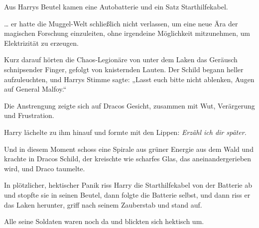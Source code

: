 Aus Harrys Beutel kamen eine Autobatterie und ein Satz Starthilfekabel.

… er hatte die Muggel-Welt schließlich nicht verlassen, um eine neue Ära der magischen Forschung einzuleiten, ohne irgendeine Möglichkeit mitzunehmen, um Elektrizität zu erzeugen.

Kurz darauf hörten die Chaos-Legionäre von unter dem Laken das Geräusch schnipsender Finger, gefolgt von knisternden Lauten. Der Schild begann heller aufzuleuchten, und Harrys Stimme sagte:
„Lasst euch bitte nicht ablenken, Augen auf General Malfoy.“

Die Anstrengung zeigte sich auf Dracos Gesicht, zusammen mit Wut, Verärgerung und Frustration.

Harry lächelte zu ihm hinauf und formte mit den Lippen: \emph{Erzähl ich dir später.}

Und in diesem Moment schoss eine Spirale aus grüner Energie aus dem Wald und krachte in Dracos Schild, der kreischte wie scharfes Glas, das aneinandergerieben wird, und Draco taumelte.

In plötzlicher, hektischer Panik riss Harry die Starthilfekabel von der Batterie ab und stopfte sie in seinen Beutel, dann folgte die Batterie selbst, und dann riss er das Laken herunter, griff nach seinem Zauberstab und stand auf.

Alle seine Soldaten waren noch da und blickten sich hektisch um.

